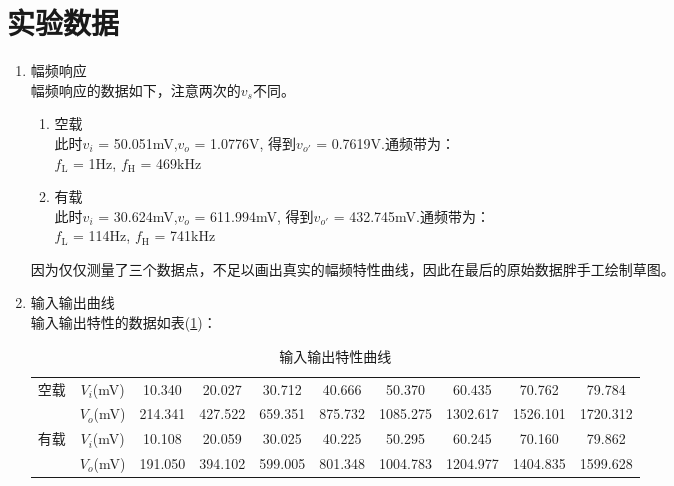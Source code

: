 \documentclass[a4paper]{article}
\begin{document}
\section{实验数据}
\begin{enumerate}
\item 幅频响应\\
幅频响应的数据如下，注意两次的$v_s$不同。
\begin{enumerate}
\item 空载\\
此时$v_i$ = 50.051mV,$v_o$ = 1.0776V, 得到$v_{o'}$ = 0.7619V.通频带为：\\
$f_\text{L}$ = 1Hz, $f_\text{H}$ = 469kHz
\item 有载\\
此时$v_i$ = 30.624mV,$v_o$ = 611.994mV, 得到$v_{o'}$ = 432.745mV.通频带为：\\
$f_\text{L}$ = 114Hz, $f_\text{H}$ = 741kHz
\end{enumerate}
因为仅仅测量了三个数据点，不足以画出真实的幅频特性曲线，因此在最后的原始数据胖手工绘制草图。
\item 输入输出曲线\\
输入输出特性的数据如表(\ref{tableIO})：
\begin{table}[!h]
\centering
\caption{输入输出特性曲线}
\label{tableIO}
\begin{tabular}{|c|c|c|c|c|c|c|c|c|c|}
\hline
\multirow{2}{*}{空载} & $V_i$(mV) & 10.340  & 20.027  & 30.712  & 40.666  & 50.370   & 60.435   & 70.762   & 79.784   \\ \cline{2-10} 
                    & $V_o$(mV) & 214.341 & 427.522 & 659.351 & 875.732 & 1085.275 & 1302.617 & 1526.101 & 1720.312 \\ \hline
\multirow{2}{*}{有载} & $V_i$(mV) & 10.108  & 20.059  & 30.025  & 40.225  & 50.295   & 60.245   & 70.160   & 79.862   \\ \cline{2-10} 
                    & $V_o$(mV) & 191.050 & 394.102 & 599.005 & 801.348 & 1004.783 & 1204.977 & 1404.835 & 1599.628 \\ \hline
\end{tabular}
\end{table}


\end{enumerate}
\end{document}
